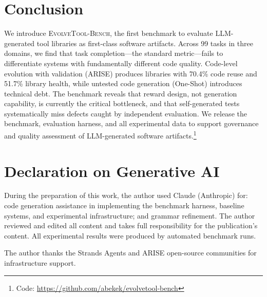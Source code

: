 \documentclass[]{ceurart}
\begin{document}
\section{Conclusion}

We introduce \textsc{EvolveTool-Bench}, the first benchmark to evaluate LLM-generated tool libraries as first-class software artifacts. Across 99 tasks in three domains, we find that task completion---the standard metric---fails to differentiate systems with fundamentally different code quality. Code-level evolution with validation (ARISE) produces libraries with 70.4\% code reuse and 51.7\% library health, while untested code generation (One-Shot) introduces technical debt. The benchmark reveals that reward design, not generation capability, is currently the critical bottleneck, and that self-generated tests systematically miss defects caught by independent evaluation. We release the benchmark, evaluation harness, and all experimental data to support governance and quality assessment of LLM-generated software artifacts.\footnote{Code: \url{https://github.com/abekek/evolvetool-bench}}

\section*{Declaration on Generative AI}
During the preparation of this work, the author used Claude (Anthropic) for: code generation assistance in implementing the benchmark harness, baseline systems, and experimental infrastructure; and grammar refinement. The author reviewed and edited all content and takes full responsibility for the publication's content. All experimental results were produced by automated benchmark runs.

\begin{acknowledgments}
The author thanks the Strands Agents and ARISE open-source communities for infrastructure support.
\end{acknowledgments}


\end{document}
